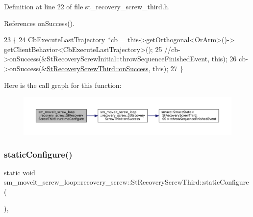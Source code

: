 Definition at line 22 of file st\+\_\+recovery\+\_\+screw\+\_\+third.\+h.



References on\+Success().


\begin{DoxyCode}
23             \{
24                 CbExecuteLastTrajectory *cb = this->getOrthogonal<OrArm>()->
      getClientBehavior<CbExecuteLastTrajectory>();
25                 \textcolor{comment}{//cb->onSuccess(&StRecoveryScrewInitial::throwSequenceFinishedEvent, this);}
26                 cb->onSuccess(&\hyperlink{structsm__moveit__screw__loop_1_1recovery__screw_1_1StRecoveryScrewThird_aac52f3cc2d70c30eeab123f065ac554f}{StRecoveryScrewThird::onSuccess}, \textcolor{keyword}{this});
27             \}
\end{DoxyCode}
Here is the call graph for this function\+:
\nopagebreak
\begin{figure}[H]
\begin{center}
\leavevmode
\includegraphics[width=350pt]{structsm__moveit__screw__loop_1_1recovery__screw_1_1StRecoveryScrewThird_a1fec3d83026dafc61ab10973dfa3cd0f_cgraph}
\end{center}
\end{figure}
\mbox{\label{structsm__moveit__screw__loop_1_1recovery__screw_1_1StRecoveryScrewThird_a1d7b501fa9a967c45f7f696fda5ab4ec}} 
\subsubsection{\texorpdfstring{static\+Configure()}{staticConfigure()}}
{\footnotesize\ttfamily static void sm\+\_\+moveit\+\_\+screw\+\_\+loop\+::recovery\+\_\+screw\+::\+St\+Recovery\+Screw\+Third\+::static\+Configure (\begin{DoxyParamCaption}{ }\end{DoxyParamCaption})\hspace{0.3cm}{\ttfamily [inline]}, {\ttfamily [static]}}



